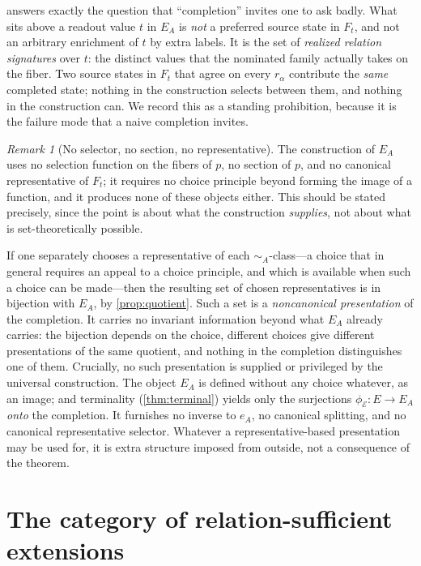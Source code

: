 \documentclass[11pt,reqno]{amsart}
\theoremstyle{plain}
\theoremstyle{definition}
\theoremstyle{remark}
\newtheorem{remark}[theorem]{Remark}
\numberwithin{equation}{section}
\begin{document}
 answers exactly the question that ``completion'' invites one to ask badly. What
sits above a readout value $t$ in $E_A$ is \emph{not} a preferred source state in $F_t$, and not an
arbitrary enrichment of $t$ by extra labels. It is the set of \emph{realized relation signatures}
over $t$: the distinct values that the nominated family actually takes on the fiber. Two source
states in $F_t$ that agree on every $r_\alpha$ contribute the \emph{same} completed state; nothing in
the construction selects between them, and nothing in the construction can. We record this as a
standing prohibition, because it is the failure mode that a naive completion invites.

\begin{remark}[No selector, no section, no representative]
\label{rem:no-selector}
The construction of $E_A$ uses no selection function on the fibers of $p$, no section of $p$, and no
canonical representative of $F_t$; it requires no choice principle beyond forming the image of a
function, and it produces none of these objects either. This should be stated precisely, since the
point is about what the construction \emph{supplies}, not about what is set-theoretically possible.

If one separately chooses a representative of each $\sim_A$-class---a choice that in general requires
an appeal to a choice principle, and which is available when such a choice can be made---then the
resulting set of chosen representatives is in bijection with $E_A$, by \cref{prop:quotient}. Such a
set is a \emph{noncanonical presentation} of the completion. It carries no invariant information
beyond what $E_A$ already carries: the bijection depends on the choice, different choices give
different presentations of the same quotient, and nothing in the completion distinguishes one of them.
Crucially, no such presentation is supplied or privileged by the universal construction. The object
$E_A$ is defined without any choice whatever, as an image; and terminality
(\cref{thm:terminal}) yields only the surjections $\phi_{\mathcal E}\colon E\to E_A$ \emph{onto} the
completion. It furnishes no inverse to $e_A$, no canonical splitting, and no canonical representative
selector. Whatever a representative-based presentation may be used for, it is extra structure imposed
from outside, not a consequence of the theorem.
\end{remark}

\section{The category of relation-sufficient extensions}
\label{sec:category}
\end{document}
